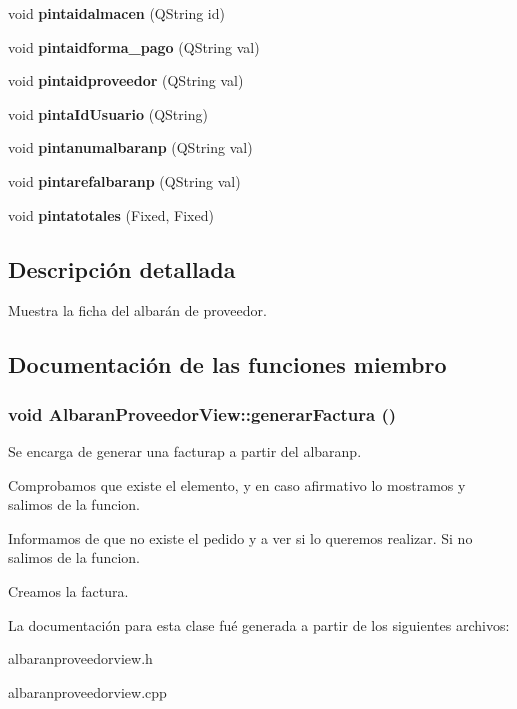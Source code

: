\begin{CompactItemize}
\item 
void {\bf pintaidalmacen} (QString id)\label{classAlbaranProveedorView_a10}

\item 
void {\bf pintaidforma\_\-pago} (QString val)\label{classAlbaranProveedorView_a11}

\item 
void {\bf pintaidproveedor} (QString val)\label{classAlbaranProveedorView_a12}

\item 
void {\bf pinta\-Id\-Usuario} (QString)\label{classAlbaranProveedorView_a13}

\item 
void {\bf pintanumalbaranp} (QString val)\label{classAlbaranProveedorView_a14}

\item 
void {\bf pintarefalbaranp} (QString val)\label{classAlbaranProveedorView_a15}

\item 
void {\bf pintatotales} (Fixed, Fixed)\label{classAlbaranProveedorView_a16}

\end{CompactItemize}


\subsection{Descripci\'{o}n detallada}
Muestra la ficha del albar\'{a}n de proveedor. 



\subsection{Documentaci\'{o}n de las funciones miembro}
\subsubsection{\setlength{\rightskip}{0pt plus 5cm}void Albaran\-Proveedor\-View::generar\-Factura ()}\label{classAlbaranProveedorView_a3}


Se encarga de generar una facturap a partir del albaranp. 

Comprobamos que existe el elemento, y en caso afirmativo lo mostramos y salimos de la funcion.

Informamos de que no existe el pedido y a ver si lo queremos realizar. Si no salimos de la funcion.

Creamos la factura. 

La documentaci\'{o}n para esta clase fu\'{e} generada a partir de los siguientes archivos:\begin{CompactItemize}
\item 
albaranproveedorview.h\item 
albaranproveedorview.cpp\end{CompactItemize}
